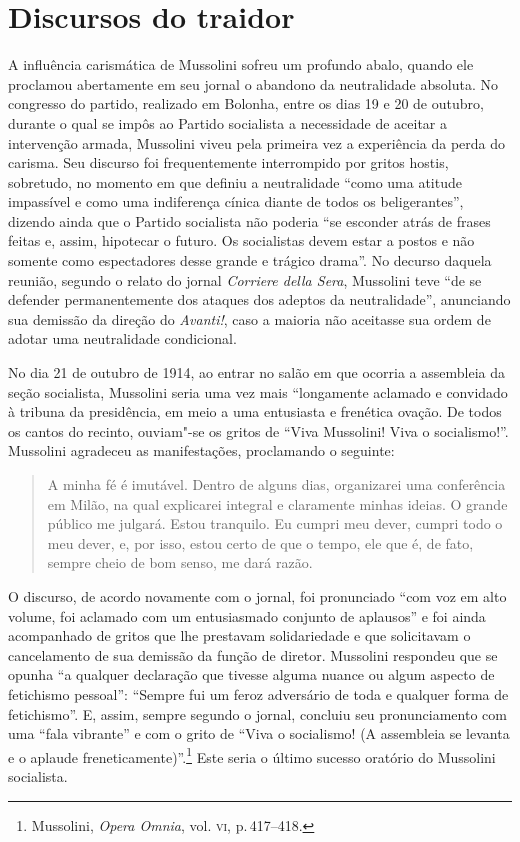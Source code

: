 \section{Discursos do traidor}

A influência carismática de Mussolini sofreu um profundo abalo, quando
ele proclamou abertamente em seu jornal o abandono da neutralidade
absoluta. No congresso do partido, realizado em Bolonha, entre os dias
19 e 20 de outubro, durante o qual se impôs ao Partido socialista a
necessidade de aceitar a intervenção armada, Mussolini viveu pela
primeira vez a experiência da perda do carisma. Seu discurso foi
frequentemente interrompido por gritos hostis, sobretudo, no momento em
que definiu a neutralidade ``como uma atitude impassível e como uma
indiferença cínica diante de todos os beligerantes'', dizendo ainda que
o Partido socialista não poderia ``se esconder atrás de frases feitas e,
assim, hipotecar o futuro. Os socialistas devem estar a postos e não
somente como espectadores desse grande e trágico drama''. No decurso
daquela reunião, segundo o relato do jornal \emph{Corriere della Sera},
Mussolini teve ``de se defender permanentemente dos ataques dos adeptos
da neutralidade'', anunciando sua demissão da direção do \emph{Avanti!},
caso a maioria não aceitasse sua ordem de adotar uma neutralidade
condicional.

No dia 21 de outubro de 1914, ao entrar no salão em que ocorria a
assembleia da seção socialista, Mussolini seria uma vez mais
``longamente aclamado e convidado à tribuna da presidência, em meio a
uma entusiasta e frenética ovação. De todos os cantos do recinto,
ouviam"-se os gritos de ``Viva Mussolini! Viva o socialismo!''. Mussolini
agradeceu as manifestações, proclamando o seguinte:

\begin{quote}
A minha fé é imutável. Dentro de alguns dias, organizarei uma
conferência em Milão, na qual explicarei integral e claramente minhas
ideias. O grande público me julgará. Estou tranquilo. Eu cumpri meu
dever, cumpri todo o meu dever, e, por isso, estou certo de que o tempo,
ele que é, de fato, sempre cheio de bom senso, me dará razão.
\end{quote}

O discurso, de acordo novamente com o jornal, foi pronunciado ``com voz
em alto volume, foi aclamado com um entusiasmado conjunto de aplausos''
e foi ainda acompanhado de gritos que lhe prestavam solidariedade e que
solicitavam o cancelamento de sua demissão da função de diretor.
Mussolini respondeu que se opunha ``a qualquer declaração que tivesse
alguma nuance ou algum aspecto de fetichismo pessoal'': ``Sempre fui um
feroz adversário de toda e qualquer forma de fetichismo''. E, assim,
sempre segundo o jornal, concluiu seu pronunciamento com uma ``fala
vibrante'' e com o grito de ``Viva o socialismo! (A assembleia se
levanta e o aplaude freneticamente)''.\footnote{Mussolini, \emph{Opera
  Omnia}, vol. \textsc{vi}, p.\,417--418.} Este seria o último sucesso oratório do
Mussolini socialista.


